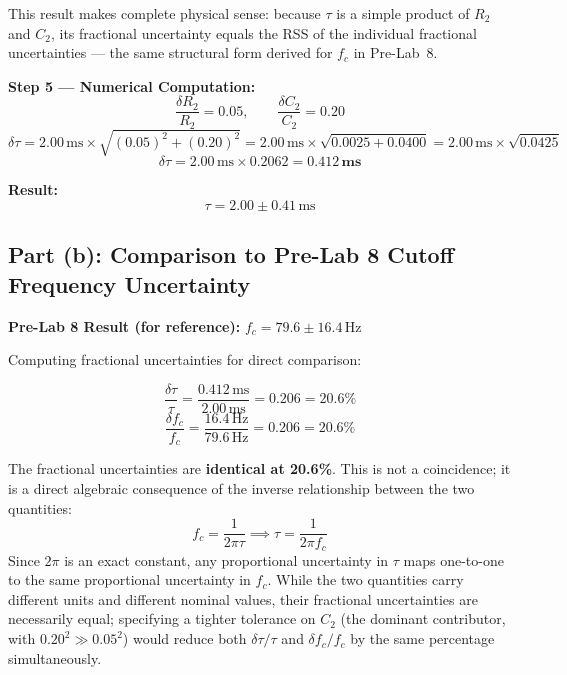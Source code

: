 \documentclass[11pt]{article}
\begin{document}
This result makes complete physical sense: because $\tau$ is a simple product of $R_2$ and $C_2$,
its fractional uncertainty equals the RSS of the individual fractional uncertainties --- the same
structural form derived for $f_c$ in Pre-Lab~8.

\textbf{Step 5 --- Numerical Computation:}
\[
  \frac{\delta R_2}{R_2} = 0.05, \qquad \frac{\delta C_2}{C_2} = 0.20
\]
\[
  \delta\tau
  = 2.00\,\text{ms} \times \sqrt{(0.05)^2 + (0.20)^2}
  = 2.00\,\text{ms} \times \sqrt{0.0025 + 0.0400}
  = 2.00\,\text{ms} \times \sqrt{0.0425}
\]
\[
  \delta\tau = 2.00\,\text{ms} \times 0.2062 = \mathbf{0.412\,\text{ms}}
\]

\textbf{Result:}
\[
  \boxed{\tau = 2.00 \pm 0.41\,\text{ms}}
\]

\subsection*{Part (b): Comparison to Pre-Lab 8 Cutoff Frequency Uncertainty}

\textbf{Pre-Lab 8 Result (for reference):} $f_c = 79.6 \pm 16.4\,\text{Hz}$

Computing fractional uncertainties for direct comparison:

\[
  \frac{\delta\tau}{\tau} = \frac{0.412\,\text{ms}}{2.00\,\text{ms}} = 0.206 = \mathbf{20.6\%}
\]
\[
  \frac{\delta f_c}{f_c} = \frac{16.4\,\text{Hz}}{79.6\,\text{Hz}} = 0.206 = \mathbf{20.6\%}
\]

The fractional uncertainties are \textbf{identical at 20.6\%}. This is not a coincidence; it is a
direct algebraic consequence of the inverse relationship between the two quantities:
\[
  f_c = \frac{1}{2\pi\tau}
  \implies
  \tau = \frac{1}{2\pi f_c}
\]
Since $2\pi$ is an exact constant, any proportional uncertainty in $\tau$ maps one-to-one to the
same proportional uncertainty in $f_c$. While the two quantities carry different units and
different nominal values, their fractional uncertainties are necessarily equal; specifying a
tighter tolerance on $C_2$ (the dominant contributor, with $0.20^2 \gg 0.05^2$) would reduce
both $\delta\tau/\tau$ and $\delta f_c/f_c$ by the same percentage simultaneously.
\end{document}
